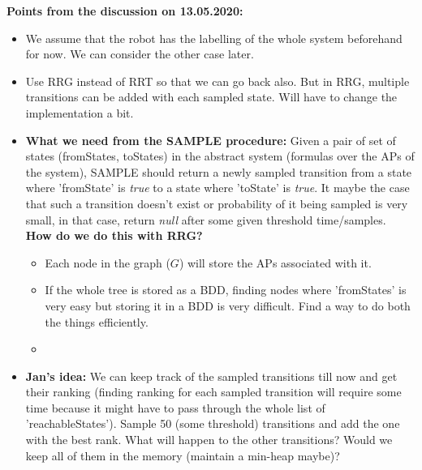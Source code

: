 \documentclass{article}
\newcommand{\kush}[1]{{\color{blue} #1}}
\begin{document}
\vspace{20pt}
\textbf{Points from the discussion on 13.05.2020:}
	\begin{itemize}
		\item We assume that the robot has the labelling of the whole system beforehand for now. We can consider the other case later.
		\item Use RRG instead of RRT so that we can go back also. But in RRG, multiple transitions can be added with each sampled state. \kush{Will have to change the implementation a bit.}
		\item \textbf{What we need from the SAMPLE procedure:} Given a pair of set of states (fromStates, toStates) in the abstract system (formulas over the APs of the system), SAMPLE should return a newly sampled transition from a state where 'fromState' is \textit{true} to a state where 'toState' is \textit{true}. It maybe the case that such a transition doesn't exist or probability of it being sampled is very small, in that case, return \emph{null} after some given threshold time/samples.\newline
		\textbf{How do we do this with RRG?}
		\begin{itemize}
			\item Each node in the graph ($G$) will store the APs associated with it. 
			\item If the whole tree is stored as a BDD, finding nodes where 'fromStates' is very easy but storing it in a BDD is very difficult. \kush{Find a way to do both the things efficiently.}
			\item 
		\end{itemize}
		
		\item \textbf{Jan's idea:} We can keep track of the sampled transitions till now and get their ranking (finding ranking for each sampled transition will require some time because it might have to pass through the whole list of 'reachableStates'). Sample 50 (some threshold) transitions and add the one with the best rank. \kush{What will happen to the other transitions? Would we keep all of them in the memory (maintain a min-heap maybe)?}
	\end{itemize}
\end{document}

